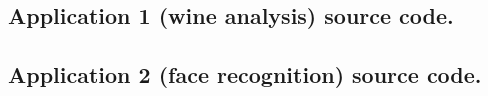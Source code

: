 \documentclass[a4paper]{article}
\begin{document}
\newpage
\subsection{Application 1 (wine analysis) source code.}
\label{app:wine_src_code}






\newpage
\subsection{Application 2 (face recognition) source code.}
\label{app:ezfaces}


\end{document}

